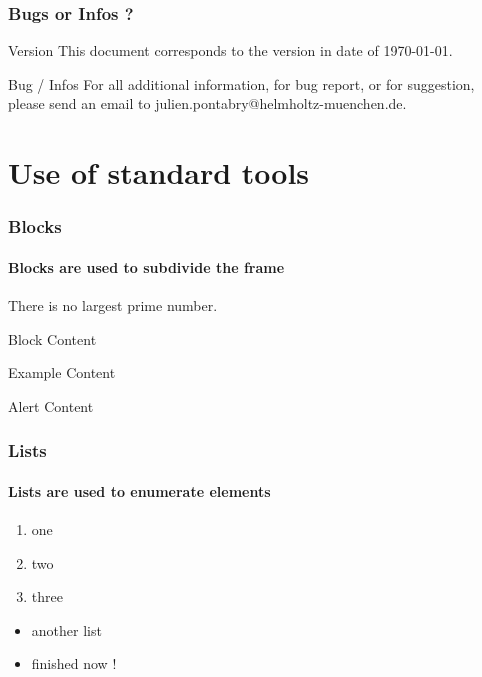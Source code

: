 \documentclass[xcolor=dvipsnames]{beamer}
\begin{document}
		\begin{frame}
			\frametitle{Bugs or Infos ?}
			\begin{exampleblock}{Version}
				This document corresponds to the version in date of \today.
			\end{exampleblock}
			\begin{alertblock}{Bug / Infos}
				For all additional information, for bug report, or for suggestion, please send an email to julien.pontabry@helmholtz-muenchen.de.
			\end{alertblock}
		\end{frame}
	
	\section{Use of standard tools}
		\begin{frame} 
			\frametitle{Blocks} 
			\framesubtitle{Blocks are used to subdivide the frame} 
			\begin{theorem}
				There is no largest prime number.
			\end{theorem} 
			\begin{block}{Block}
				Content
			\end{block}
			\begin{exampleblock}{Example}
				Content
			\end{exampleblock}
			\begin{alertblock}{Alert}
				Content
			\end{alertblock}		
		\end{frame}
		
		\begin{frame}
			\frametitle{Lists}
			\framesubtitle{Lists are used to enumerate elements}
			\begin{enumerate}
				\item one
				\item two
				\item three
			\end{enumerate}
			\begin{itemize}
				\item another list
				\item<2-> finished now !
			\end{itemize}
		\end{frame}
\end{document}
